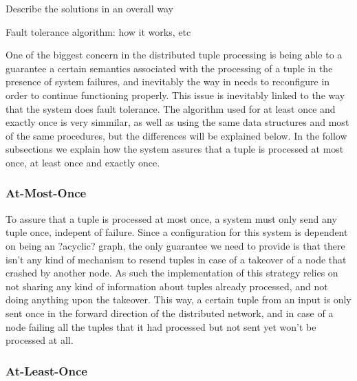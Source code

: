 \documentclass[times, 10pt,twocolumn]{article}
\begin{document}
Describe the solutions in an overall way


Fault tolerance algorithm: how it works, etc


One of the biggest concern in the distributed tuple processing is being
able to a guarantee a certain semantics associated with the processing of
a tuple in the presence of system failures, and inevitably the way in
needs to reconfigure in order to continue functioning properly. This issue
is inevitably linked to the way that the system does fault tolerance. The
algorithm used for at least once and exactly once is very simmilar, as
well as using the same data structures and most of the same procedures,
but the differences will be explained below. In the follow subsections we
explain how the system assures that a tuple is processed at most once, at
least once and exactly once.

\subsubsection{At-Most-Once}

To assure that a tuple is processed at most once, a system must only send
any tuple once, indepent of failure. Since a configuration for this system
is dependent on being an ?acyclic? graph, the only guarantee we need to
provide is that there isn't any kind of mechanism to resend tuples in case
of a takeover of a node that crashed by another node.  As such the
implementation of this strategy relies on not sharing any kind of
information about tuples already processed, and not doing anything upon
the takeover. This way, a certain tuple from an input is only sent once in
the forward direction of the distributed network, and in case of a node
failing all the tuples that it had processed but not sent yet won't be
processed at all.

\subsubsection{At-Least-Once}
\end{document}
